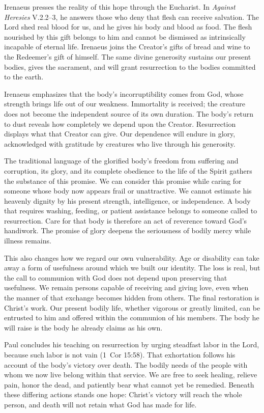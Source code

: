 Irenaeus presses the reality of this hope through the Eucharist. In \emph{Against Heresies} V.2.2--3, he answers those who deny that flesh can receive salvation. The Lord shed real blood for us, and he gives his body and blood as food. The flesh nourished by this gift belongs to him and cannot be dismissed as intrinsically incapable of eternal life. Irenaeus joins the Creator's gifts of bread and wine to the Redeemer's gift of himself. The same divine generosity sustains our present bodies, gives the sacrament, and will grant resurrection to the bodies committed to the earth.

Irenaeus emphasizes that the body's incorruptibility comes from God, whose strength brings life out of our weakness. Immortality is received; the creature does not become the independent source of its own duration. The body's return to dust reveals how completely we depend upon the Creator. Resurrection displays what that Creator can give. Our dependence will endure in glory, acknowledged with gratitude by creatures who live through his generosity.

The traditional language of the glorified body's freedom from suffering and corruption, its glory, and its complete obedience to the life of the Spirit gathers the substance of this promise. We can consider this promise while caring for someone whose body now appears frail or unattractive. We cannot estimate his heavenly dignity by his present strength, intelligence, or independence. A body that requires washing, feeding, or patient assistance belongs to someone called to resurrection. Care for that body is therefore an act of reverence toward God's handiwork. The promise of glory deepens the seriousness of bodily mercy while illness remains.

This also changes how we regard our own vulnerability. Age or disability can take away a form of usefulness around which we built our identity. The loss is real, but the call to communion with God does not depend upon preserving that usefulness. We remain persons capable of receiving and giving love, even when the manner of that exchange becomes hidden from others. The final restoration is Christ's work. Our present bodily life, whether vigorous or greatly limited, can be entrusted to him and offered within the communion of his members. The body he will raise is the body he already claims as his own.

Paul concludes his teaching on resurrection by urging steadfast labor in the Lord, because such labor is not vain (1~Cor 15:58). That exhortation follows his account of the body's victory over death. The bodily needs of the people with whom we now live belong within that service. We are free to seek healing, relieve pain, honor the dead, and patiently bear what cannot yet be remedied. Beneath these differing actions stands one hope: Christ's victory will reach the whole person, and death will not retain what God has made for life.

